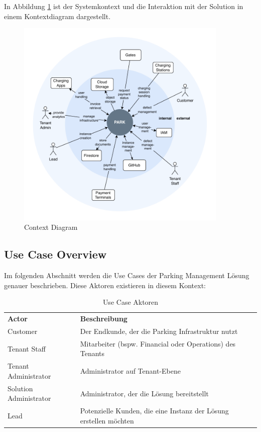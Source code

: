 In Abbildung \ref{fig:context-diagram} ist der Systemkontext und die Interaktion mit der Solution in einem Kontextdiagram dargestellt.

\begin{figure}[H]
    \centering
    \includegraphics[width=0.9\textwidth]{resources/context-diagram.pdf}
    \caption{Context Diagram}
    \label{fig:context-diagram}
\end{figure}


\subsection{Use Case Overview}
Im folgenden Abschnitt werden die Use Cases der Parking Management Lösung genauer beschrieben. Diese Aktoren existieren in diesem Kontext:

\renewcommand{\arraystretch}{1.5}
{
\begin{longtable}{l p{10cm}}
    \caption{Use Case Aktoren}
    \label{tab:use-case-actors} \\
    \textbf{Actor} & \textbf{Beschreibung} \\ [1ex]
    Customer & Der Endkunde, der die Parking Infrastruktur nutzt \\ [0.5ex]
    Tenant Staff & Mitarbeiter (bspw. Financial oder Operations) des Tenants \\ [0.5ex]
    Tenant Administrator & Administrator auf Tenant-Ebene \\ [0.5ex]
    Solution Administrator & Administrator, der die Lösung bereitstellt \\ [0.5ex]
    Lead & Potenzielle Kunden, die eine Instanz der Lösung erstellen möchten \\ 
\end{longtable}}


